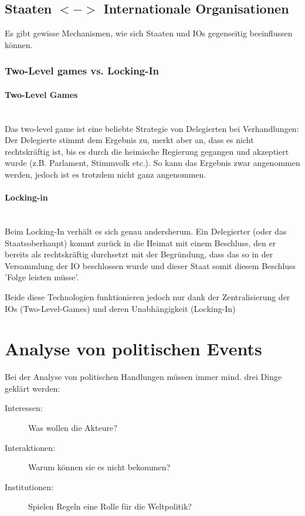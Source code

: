 \documentclass[a4paper, 11pt]{article}
\begin{document}
\subsection{Staaten $<->$ Internationale Organisationen}

Es gibt gewisse Mechanismen, wie sich Staaten und IOs gegenseitig beeinflussen können.

\subsubsection{Two-Level games vs. Locking-In}

\paragraph{Two-Level Games} \mbox{}\\
Das two-level game ist eine beliebte Strategie von Delegierten bei Verhandlungen: Der Delegierte stimmt dem Ergebnis zu, merkt aber an, dass es nicht rechtskräftig ist, bis es durch die heimische Regierung gegangen und akzeptiert wurde (z.B. Parlament, Stimmvolk etc.). So kann das Ergebnis zwar angenommen werden, jedoch ist es trotzdem nicht ganz angenommen.

\paragraph{Locking-in} \mbox{}\\
Beim Locking-In verhält es sich genau andersherum. Ein Delegierter (oder das Staatsoberhaupt) kommt zurück in die Heimat mit einem Beschluss, den er bereits als rechtskräftig durchsetzt mit der Begründung, dass das so in der Versammlung der IO beschlossen wurde und dieser Staat somit diesem Beschluss 'Folge leisten müsse'.

\vspace{10px}

\noindent Beide diese Technologien funktionieren jedoch nur dank der Zentralisierung der IOs (Two-Level-Games) und deren Unabhängigkeit (Locking-In)

\section{Analyse von politischen Events}

Bei der Analyse von politischen Handlungen müssen immer mind. drei Dinge geklärt werden:

\begin{description}
	\item[Interessen: ] Was wollen die Akteure?
	\item[Interaktionen:] Warum können sie es nicht bekommen?
	\item[Institutionen: ] Spielen Regeln eine Rolle für die Weltpolitik?
\end{description}
\end{document}
